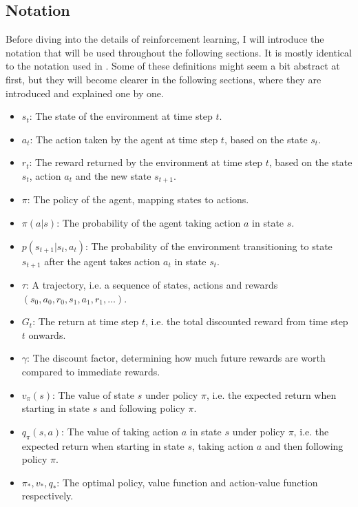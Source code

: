 \subsection{Notation}
\label{subsec:notation}
Before diving into the details of reinforcement learning, I will introduce the notation that will be used throughout the following sections.
It is mostly identical to the notation used in \cite{sutton_reinforcement_nodate}.
Some of these definitions might seem a bit abstract at first, but they will become clearer in the following sections, where they are introduced and explained one by one.

\begin{itemize}
    \item $s_t$: The state of the environment at time step $t$.
    \item $a_t$: The action taken by the agent at time step $t$, based on the state $s_t$.
    \item $r_t$: The reward returned by the environment at time step $t$, based on the state $s_t$, action $a_t$ and the new state $s_{t+1}$.
    \item $\pi$: The policy of the agent, mapping states to actions.
    \item $\pi(a|s)$: The probability of the agent taking action $a$ in state $s$.
    \item $p(s_{t+1} | s_t, a_t)$: The probability of the environment transitioning to state $s_{t+1}$ after the agent takes action $a_t$ in state $s_t$.
    \item $\tau$: A trajectory, i.e. a sequence of states, actions and rewards $(s_0, a_0, r_0, s_1, a_1, r_1, \dots)$.
    \item $G_t$: The return at time step $t$, i.e. the total discounted reward from time step $t$ onwards.
    \item $\gamma$: The discount factor, determining how much future rewards are worth compared to immediate rewards.
    \item $v_\pi(s)$: The value of state $s$ under policy $\pi$, i.e. the expected return when starting in state $s$ and following policy $\pi$.
    \item $q_\pi(s, a)$: The value of taking action $a$ in state $s$ under policy $\pi$, i.e. the expected return when starting in state $s$, taking action $a$ and then following policy $\pi$.
    \item $\pi_*, v_*, q_*$: The optimal policy, value function and action-value function respectively.
\end{itemize}


